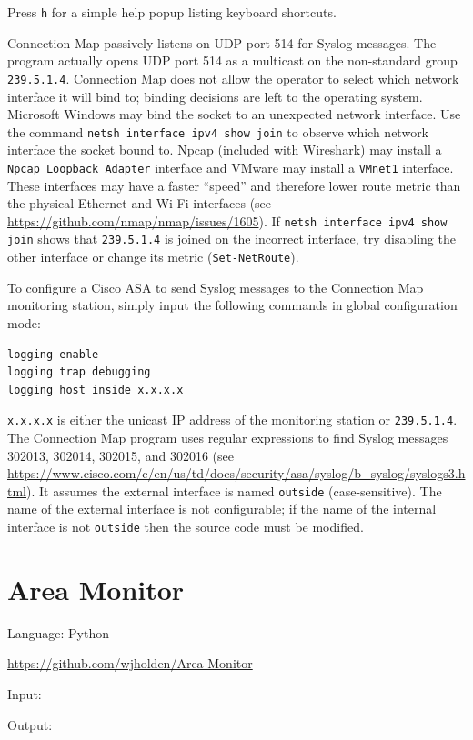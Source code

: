 \documentclass[12pt]{article}
\begin{document}
Press \texttt{h} for a simple help popup listing keyboard shortcuts.

Connection Map passively listens on UDP port 514 for Syslog messages. The program actually opens UDP port 514 as a multicast on the non-standard group \texttt{239.5.1.4}. Connection Map does not allow the operator to select which network interface it will bind to; binding decisions are left to the operating system. Microsoft Windows may bind the socket to an unexpected network interface. Use the command \texttt{netsh interface ipv4 show join} to observe which network interface the socket bound to. Npcap (included with Wireshark) may install a \texttt{Npcap Loopback Adapter} interface and VMware may install a \texttt{VMnet1} interface. These interfaces may have a faster ``speed'' and therefore lower route metric than the physical Ethernet and Wi-Fi interfaces (see \url{https://github.com/nmap/nmap/issues/1605}). If \texttt{netsh interface ipv4 show join} shows that \texttt{239.5.1.4} is joined on the incorrect interface, try disabling the other interface or change its metric (\texttt{Set-NetRoute}).

To configure a Cisco ASA to send Syslog messages to the Connection Map monitoring station, simply input the following commands in global configuration mode:

\begin{lstlisting}
logging enable
logging trap debugging
logging host inside x.x.x.x
\end{lstlisting}

\texttt{x.x.x.x} is either the unicast IP address of the monitoring station or \texttt{239.5.1.4}. The Connection Map program uses regular expressions to find Syslog messages 302013, 302014, 302015, and 302016 (see \url{https://www.cisco.com/c/en/us/td/docs/security/asa/syslog/b_syslog/syslogs3.html}). It assumes the external interface is named \texttt{outside} (case-sensitive). The name of the external interface is not configurable; if the name of the internal interface is not \texttt{outside} then the source code must be modified.

\section{Area Monitor}

Language: Python

\url{https://github.com/wjholden/Area-Monitor}

Input: 

Output: 
\end{document}
